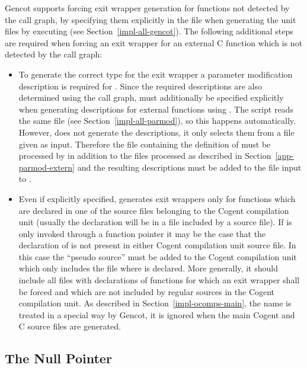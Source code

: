 Gencot supports forcing exit wrapper generation for functions not detected by the call graph, by specifying them
explicitly in the file  when generating the unit files by executing 
(see Section~\ref{impl-all-gencot}). The following additional steps are
required when forcing an exit wrapper for an external C function  which is not detected by the call graph:
\begin{itemize}
\item To generate the correct type for the exit wrapper a parameter modification description is required for 
. Since the required descriptions are also determined using the call graph,  must additionally
be specified explicitly when generating descriptions for external functions using . The
 script reads the same file  (see Section~\ref{impl-all-parmod}),
so this happens automatically. However,  does not generate the descriptions, it only selects 
them from a file given as input. Therefore the file containing the definition of  must be processed 
by  in addition to the files processed as described in Section~\ref{app-parmod-extern} and the 
resulting descriptions must be added to the file input to .
\item Even if explicitly specified,  generates exit wrappers only for functions which are declared
in one of the source files belonging to the Cogent compilation unit (usually the declaration will be in a 
file included by a source file). If  is only invoked through a function pointer it may be the case that
the declaration of  is not present in either Cogent compilation unit source file. In this case the ``pseudo
source''  must be added to the Cogent compilation unit which only includes the  
file where  is declared. More generally, it should include all  files with declarations of functions 
for which an exit wrapper shall be forced and which are not included by regular sources in the Cogent compilation unit.
As described in Section~\ref{impl-ocomps-main}, the name  is treated in a special
way by Gencot, it is ignored when the main Cogent and C source files are generated.
\end{itemize}

\subsection{The Null Pointer}
\label{app-transfunction-null}

